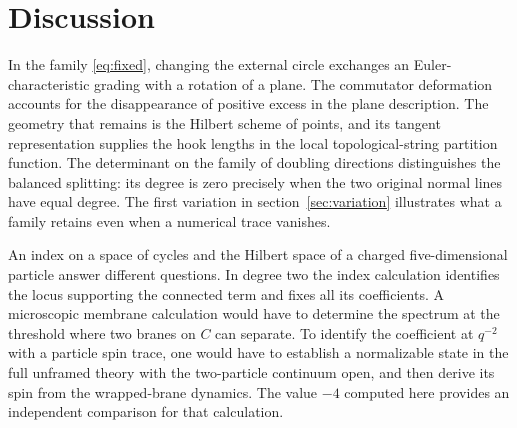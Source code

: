 \section{Discussion}\label{sec:discussion}

In the family \eqref{eq:fixed}, changing the external circle exchanges
an Euler-characteristic grading with a rotation of a plane. The commutator
deformation accounts for the disappearance of positive excess in the
plane description. The geometry that remains is the Hilbert scheme of
points, and its tangent representation supplies the hook lengths in
the local topological-string partition function. The determinant on the
family of doubling directions distinguishes the balanced splitting:
its degree is zero precisely when the two original normal lines have
equal degree. The first variation in section~\ref{sec:variation}
illustrates what a family retains even when a numerical trace vanishes.

An index on a space of cycles and the Hilbert space of a charged
five-dimensional particle answer different questions. In degree two the
index calculation identifies the locus supporting the connected term
and fixes all its coefficients. A microscopic membrane calculation would
have to determine the spectrum at the threshold where two branes on $C$
can separate. To identify the coefficient at $q^{-2}$ with a particle
spin trace, one would have to establish a normalizable state in the full
unframed theory with the two-particle continuum open, and then derive
its spin from the wrapped-brane dynamics. The value $-4$ computed here
provides an independent comparison for that calculation.
